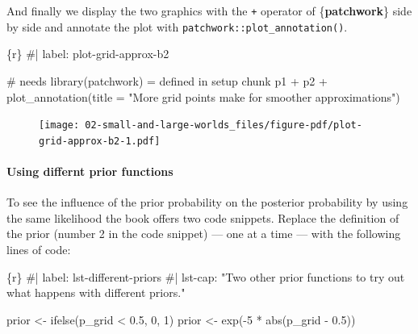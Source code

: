 \documentclass[
  letterpaper,
  DIV=11,
  numbers=noendperiod]{scrreprt}
\let\oldparagraph\paragraph
\renewcommand{\paragraph}[1]{\oldparagraph{#1}\mbox{}}
\newenvironment{Shaded}{\begin{snugshade}}{\end{snugshade}}
\newcommand{\AttributeTok}[1]{\textcolor[rgb]{0.40,0.45,0.13}{#1}}
\newcommand{\CommentTok}[1]{\textcolor[rgb]{0.37,0.37,0.37}{#1}}
\newcommand{\DecValTok}[1]{\textcolor[rgb]{0.68,0.00,0.00}{#1}}
\newcommand{\FloatTok}[1]{\textcolor[rgb]{0.68,0.00,0.00}{#1}}
\newcommand{\FunctionTok}[1]{\textcolor[rgb]{0.28,0.35,0.67}{#1}}
\newcommand{\InformationTok}[1]{\textcolor[rgb]{0.37,0.37,0.37}{#1}}
\newcommand{\NormalTok}[1]{\textcolor[rgb]{0.00,0.23,0.31}{#1}}
\newcommand{\OtherTok}[1]{\textcolor[rgb]{0.00,0.23,0.31}{#1}}
\newcommand{\SpecialCharTok}[1]{\textcolor[rgb]{0.37,0.37,0.37}{#1}}
\newcommand{\StringTok}[1]{\textcolor[rgb]{0.13,0.47,0.30}{#1}}
\begin{document}
And finally we display the two graphics with the \texttt{+} operator of
\{\textbf{patchwork}\} side by side and annotate the plot with
\texttt{patchwork::plot\_annotation()}.

\begin{Shaded}
\begin{Highlighting}[]
\InformationTok{\textasciigrave{}\textasciigrave{}\textasciigrave{}\{r\}}
\CommentTok{\#| label: plot{-}grid{-}approx{-}b2}

\CommentTok{\# needs library(patchwork) = defined in setup chunk}
\NormalTok{p1 }\SpecialCharTok{+}\NormalTok{ p2 }\SpecialCharTok{+} \FunctionTok{plot\_annotation}\NormalTok{(}\AttributeTok{title =} \StringTok{"More grid points make for smoother approximations"}\NormalTok{)}
\InformationTok{\textasciigrave{}\textasciigrave{}\textasciigrave{}}
\end{Highlighting}
\end{Shaded}

\begin{figure}[H]

{\centering \texttt{[image: 02-small-and-large-worlds\_files/figure-pdf/plot-grid-approx-b2-1.pdf]}

}

\end{figure}

\hypertarget{using-differnt-prior-functions}{%
\paragraph{Using differnt prior
functions}\label{using-differnt-prior-functions}}

To see the influence of the prior probability on the posterior
probability by using the same likelihood the book offers two code
snippets. Replace the definition of the prior (number 2 in the code
snippet) --- one at a time --- with the following lines of code:

\begin{Shaded}
\begin{Highlighting}[]
\InformationTok{\textasciigrave{}\textasciigrave{}\textasciigrave{}\{r\}}
\CommentTok{\#| label: lst{-}different{-}priors}
\CommentTok{\#| lst{-}cap: "Two other prior functions to try out what happens with different priors."}

\NormalTok{prior }\OtherTok{\textless{}{-}} \FunctionTok{ifelse}\NormalTok{(p\_grid }\SpecialCharTok{\textless{}} \FloatTok{0.5}\NormalTok{, }\DecValTok{0}\NormalTok{, }\DecValTok{1}\NormalTok{)}
\NormalTok{prior }\OtherTok{\textless{}{-}} \FunctionTok{exp}\NormalTok{(}\SpecialCharTok{{-}}\DecValTok{5} \SpecialCharTok{*} \FunctionTok{abs}\NormalTok{(p\_grid }\SpecialCharTok{{-}} \FloatTok{0.5}\NormalTok{))}
\InformationTok{\textasciigrave{}\textasciigrave{}\textasciigrave{}}
\end{Highlighting}
\end{Shaded}
\end{document}
